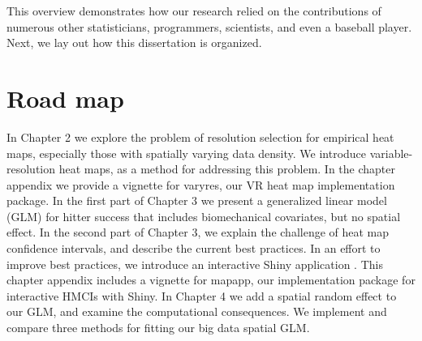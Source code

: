 This overview demonstrates how our research relied on the contributions of numerous other statisticians, programmers, scientists, and even a baseball player. Next, we lay out how this dissertation is organized.

\section{Road map}

In Chapter 2 we explore the problem of resolution selection for empirical heat maps, especially those with spatially varying data density. We introduce variable-resolution heat maps, as a method for addressing this problem. In the chapter appendix we provide a vignette for varyres, our VR heat map implementation package. In the first part of Chapter 3 we present a generalized linear model (GLM) for hitter success that includes biomechanical covariates, but no spatial effect. In the second part of Chapter 3, we explain the challenge of heat map confidence intervals, and describe the current best practices. In an effort to improve best practices, we introduce an interactive Shiny application \citep{Shiny}. This chapter appendix includes a vignette for mapapp, our implementation package for interactive HMCIs with Shiny. In Chapter 4 we add a spatial random effect to our GLM, and examine the computational consequences. We implement and compare three methods for fitting our big data spatial GLM.
